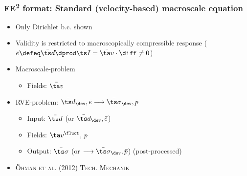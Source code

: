 \documentclass[11pt]{beamer} %
\newcommand{\roughcite}[1]{\textsc{#1}}
\begin{document}
\begin{frame}
 \frametitle{FE\textsuperscript{2} format: Standard (velocity-based) macroscale equation}
 \begin{itemize}
  \item Only Dirichlet b.c. shown
  \item Validity is restricted to macroscopically compressible response ($\bar{e} \defeq \bar{\ts d} \dprod \ts I = \bar{\ta v}\cdot \diff\neq 0$)
 \end{itemize}
 \begin{itemize}
  \item Macroscale-problem
  \begin{itemize}
   \item Fields: $\bar{\ta v}$%
  \end{itemize}
  \item RVE-problem: $\bar{\ts d}_\dev, \bar{e} \longrightarrow \bar{\ts\sigma}_\dev, \bar{p}$
  \begin{itemize}
   \item Input: $\bar{\ts d}$ (or $\bar{\ts d}_\dev, \bar{e}$)
   \item Fields: $\ta v^\fluct$, $p$%
   \item Output: $\bar{\ts\sigma}$ (or $\longrightarrow \bar{\ts\sigma}_\dev, \bar{p}$) (post-processed)
  \end{itemize}
 \end{itemize}

 \begin{itemize}
   \item \roughcite{\"Ohman et al. (2012) Tech. Mechanik}
 \end{itemize}

\end{frame}



\end{document}
